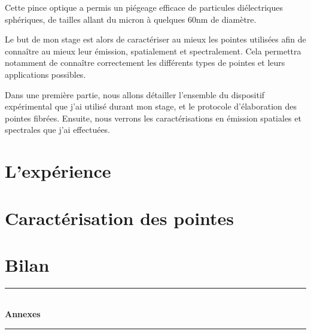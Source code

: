 \documentclass[a4paper,12pt]{report}
\begin{document}
Cette pince optique a permis un piégeage efficace de particules diélectriques sphériques, de tailles allant du micron à quelques 60nm de diamètre.

Le but de mon stage est alors de caractériser au mieux les pointes utilisées afin de connaître au mieux leur émission, spatialement et spectralement. Cela permettra notamment de connaître correctement les différents types de pointes et leurs applications possibles.

Dans une première partie, nous allons détailler l'ensemble du dispositif expérimental que j'ai utilisé durant mon stage, et le protocole d'élaboration des pointes fibrées. Ensuite, nous verrons les caractérisations en émission spatiales et spectrales que j'ai effectuées.

\chapter{L'expérience}


\chapter{Caractérisation des pointes}


\chapter*{Bilan}
%





\newpage
\appendix
{}
{}

\vspace*{8cm}
\begin{center}
\rule{\linewidth}{0.5mm}\\[0.7cm]
{\huge{\bfseries Annexes}}\\[0.4cm]
\rule{\linewidth}{0.5mm}\\[0.5cm]


\end{center}
%

\newpage
%
\end{document}
